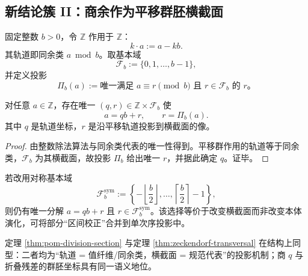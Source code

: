 \subsection{新结论簇 II：商余作为平移群胚横截面}\label{subsec:pom-division-groupoid}
\begin{definition}[平移群胚与基本域]\label{def:pom-translation-groupoid}
固定整数 $b>0$，令 $\mathbb{Z}$ 作用于 $\mathbb{Z}$：
\[
k\cdot a:=a-kb.
\]
其轨道即同余类 $a\bmod b$。取基本域
\[
\mathcal F_b:=\{0,1,\dots,b-1\},
\]
并定义投影
\[
\Pi_b(a):=\text{唯一满足 }a\equiv r\pmod b\text{ 且 }r\in\mathcal F_b\text{ 的 }r。
\]
\end{definition}

\begin{theorem}[商余作为横截面投影]\label{thm:pom-division-section}
对任意 $a\in\mathbb{Z}$，存在唯一 $(q,r)\in\mathbb{Z}\times\mathcal F_b$ 使
\[
a=qb+r,\qquad r=\Pi_b(a).
\]
其中 $q$ 是轨道坐标，$r$ 是沿平移轨道投影到横截面的像。
\end{theorem}
\begin{proof}
由整数除法算法与同余类代表的唯一性得到。平移群作用的轨道等于同余类，$\mathcal F_b$ 为其横截面，故投影 $\Pi_b$ 给出唯一 $r$，并据此确定 $q$。证毕。
\end{proof}

\begin{corollary}[中心余数横截面]\label{cor:pom-symmetric-remainder}
若改用对称基本域
\[
\mathcal F_b^{\mathrm{sym}}:=\left\{-\left\lfloor\frac{b}{2}\right\rfloor,\dots,\left\lceil\frac{b}{2}\right\rceil-1\right\},
\]
则仍有唯一分解 $a=qb+r$ 且 $r\in\mathcal F_b^{\mathrm{sym}}$。该选择等价于改变横截面而非改变本体演化，可将部分“区间校正”合并到单次序投影中。
\end{corollary}

\begin{remark}
定理 \ref{thm:pom-division-section} 与定理 \ref{thm:zeckendorf-transversal} 在结构上同型：二者均为“轨道 = 值纤维/同余类，横截面 = 规范代表”的投影机制；商 $q$ 与折叠残差的群胚坐标具有同一语义地位。
\end{remark}


